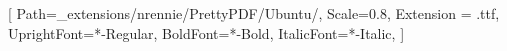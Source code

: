   
\makeatletter
\renewcommand{\maketitle}{\bgroup\setlength{\parindent}{0pt}
\begin{flushleft}
  {\sffamily\huge\textbf{\MakeUppercase{\@title}}} \vspace{0.3cm} \newline
  {\Large {\@subtitle}} \newline
  \@author
\end{flushleft}\egroup
}
\makeatother

\setsansfont{Ubuntu}[
    Path=_extensions/nrennie/PrettyPDF/Ubuntu/,
    Scale=0.8,
    Extension = .ttf,
    UprightFont=*-Regular,
    BoldFont=*-Bold,
    ItalicFont=*-Italic,
    ]


